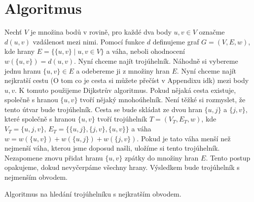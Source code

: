 \section{Algoritmus}
\label{sec:algoritmus}

Nechť $V$ je množina bodů v rovině, pro každé dva body $u, v \in V$ označme $d(u, v)$ vzdálenost mezi nimi. Pomocí funkce $d$ definujeme graf $G = (V, E, w)$, kde hrany $E = \{\{u, v\} \mid u, v \in V\}$ a váha, neboli ohodnocení $w(\{u, v\}) = d(u, v)$. Nyní chceme najít trojúhelník. Náhodně si vybereme jednu hranu $\{u, v\} \in E$ a odebereme ji z množiny hran $E$. Nyní chceme najít nejkratší cestu (O tom co je cesta si můžete přečíst v Appendixu idk) mezi body $u, v$. K tomuto použijeme Dijkstrův algoritmus. Pokud nějaká cesta existuje, společně s hranou $\{u, v\}$ tvoří nějaký mnohoúhelník. Není těžké si rozmyslet, že tento útvar bude trojúhelník. Cesta se bude skládat ze dvou hran $\{u, j\}$ a $\{j, v\}$, které společně s hranou $\{u, v\}$ tvoří trojúhelník $T = (V_T, E_T, w)$, kde $V_T = \{u, j, v\}$, $E_T = \{\{u,j\}, \{j,v\}, \{u,v\}\}$ a váha $w = w(\{u, v\}) + w(\{u, j\}) + w(\{j, v\})$. Pokud je tato váha menší než nejmenší váha, kterou jsme doposud našli, uložíme si tento trojúhelník. Nezapomene znovu přidat hranu $\{u, v\}$ zpátky do množiny hran $E$. Tento postup opakujeme, dokud nevyčerpáme všechny hrany. Výsledkem bude trojúhelník s nejmenším obvodem.

\begin{algorithm}
    \caption{Algoritmus na hledání trojúhelníku s nejkratším obvodem.}
    \label{alg:algoritmus}
   
   
    \BlankLine
    \;
   \end{algorithm}